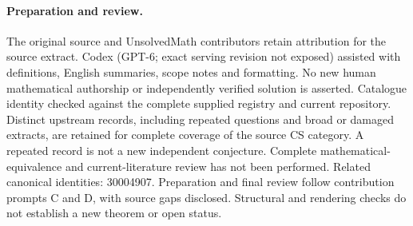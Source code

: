 \documentclass[11pt]{article}
\begin{document}
\paragraph{Preparation and review.}
The original source and UnsolvedMath contributors retain attribution for the source extract. Codex (GPT-6; exact serving revision not exposed) assisted with definitions, English summaries, scope notes and formatting. No new human mathematical authorship or independently verified solution is asserted. Catalogue identity checked against the complete supplied registry and current repository. Distinct upstream records, including repeated questions and broad or damaged extracts, are retained for complete coverage of the source CS category. A repeated record is not a new independent conjecture. Complete mathematical-equivalence and current-literature review has not been performed. Related canonical identities: 30004907. Preparation and final review follow contribution prompts C and D, with source gaps disclosed. Structural and rendering checks do not establish a new theorem or open status.
\label{end:statement}
\end{document}
